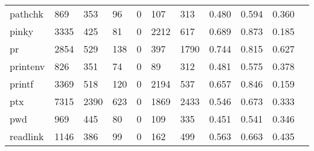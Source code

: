 \begin{longtable}{lp{1.10cm}p{1.10cm}p{1.10cm}p{1.10cm}p{1.10cm}p{1.10cm}p{1.10cm}p{1.10cm}p{1.10cm}p{1.10cm}}
pathchk   &                    869 &                                353 &                                96 &                                0 &                               107 &                             313 &                             0.480 &                                 0.594 &                               0.360 \\
pinky     &                   3335 &                                425 &                                81 &                                0 &                              2212 &                             617 &                             0.689 &                                 0.873 &                               0.185 \\
pr        &                   2854 &                                529 &                               138 &                                0 &                               397 &                            1790 &                             0.744 &                                 0.815 &                               0.627 \\
printenv  &                    826 &                                351 &                                74 &                                0 &                                89 &                             312 &                             0.481 &                                 0.575 &                               0.378 \\
printf    &                   3369 &                                518 &                               120 &                                0 &                              2194 &                             537 &                             0.657 &                                 0.846 &                               0.159 \\
ptx       &                   7315 &                               2390 &                               623 &                                0 &                              1869 &                            2433 &                             0.546 &                                 0.673 &                               0.333 \\
pwd       &                    969 &                                445 &                                80 &                                0 &                               109 &                             335 &                             0.451 &                                 0.541 &                               0.346 \\
readlink  &                   1146 &                                386 &                                99 &                                0 &                               162 &                             499 &                             0.563 &                                 0.663 &                               0.435 \\

\end{longtable}
